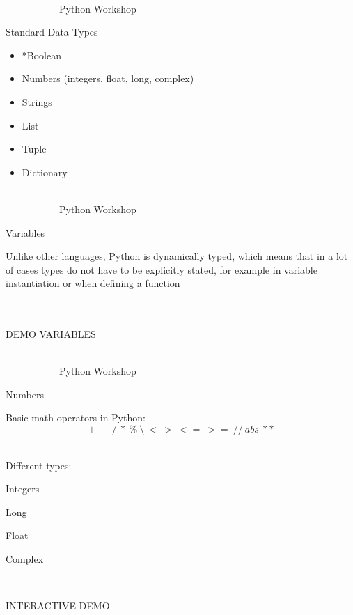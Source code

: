 \documentclass[10pt, xcolor=dvisnames]{beamer}
\begin{document}
\begin{frame}{{\tiny \ \\\vspace{-13pt} \ \ \ \ \ \ \ \ \ \ \ Python Workshop}\\ \centerline{Standard Data Types}}
\vspace*{-50pt}

\begin{itemize}
\item *Boolean
\item Numbers (integers, float, long, complex)
\item Strings
\item List
\item Tuple
\item Dictionary
\end{itemize}


\end{frame}



\begin{frame}{{\tiny \ \\\vspace{-13pt} \ \ \ \ \ \ \ \ \ \ \ Python Workshop}\\ \centerline{Variables}}
\vspace*{-50pt}

Unlike other languages, Python is dynamically typed, which means that in a lot of cases types do not have to be explicitly stated, for example in variable instantiation or when defining a function\\

\ \\
\ \\
\centerline{DEMO VARIABLES}


\end{frame}




\begin{frame}{{\tiny \ \\\vspace{-13pt} \ \ \ \ \ \ \ \ \ \ \ Python Workshop}\\ \centerline{Numbers}}
\vspace*{-50pt}

Basic math operators in Python:
\[+\ -\ /\ *\ \%\ \setminus \ <\ >\ <=\ >=\ //\ abs\ **\]

\ \\
Different types:
\begin{center}
\item Integers
\item Long
\item Float
\item Complex
\end{center}

\ \\
\centerline{INTERACTIVE DEMO}

\end{frame}
\end{document}
